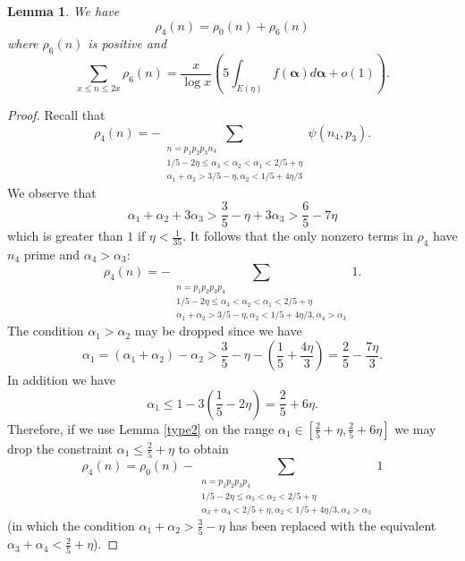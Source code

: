 \documentclass[12pt]{amsart}
\theoremstyle{plain}
\newtheorem{lem}{Lemma}
\theoremstyle{definition}
\newcommand{\bs}{\boldsymbol}
\numberwithin{equation}{section}
\def \a{\alpha} \def \b{\beta} \def \d{\delta} \def \e{\varepsilon} \def \g{\gamma} \def \k{\kappa} \def \l{\lambda} \def \s{\sigma} \def \t{\theta} \def \z{\zeta}
\newcommand{\threesum}[3]{\sum_{\substack{#1\\#2\\#3}}}
\begin{document}
\begin{lem}\label{rho4}
We have 
$$\rho_4(n)=\rho_0(n)+\rho_6(n)$$ 
where $\rho_6(n)$ is positive and 
$$\sum_{x\leq n\leq 2x}\rho_6(n)=\frac{x}{\log x}\left(5\int_{E(\eta)} f(\bs \a)d\bs \a+o(1)\right).$$
\end{lem}

\begin{proof}
Recall that 
$$\rho_4(n)=-\threesum{n=p_1p_2p_3n_4}{1/5-2\eta\leq \a_3<\a_2<\a_1< 2/5+\eta}{\a_1+\a_2>3/5-\eta,\a_2<1/5+4\eta/3}\psi(n_4,p_3).$$
We observe that 
$$\a_1+\a_2+3\a_3>\frac35-\eta+3\a_3>\frac65-7\eta$$
which is greater than $1$ if $\eta<\frac{1}{35}$.  It follows that the only nonzero terms in $\rho_4$ have $n_4$ prime and $\a_4>\a_3$:
$$\rho_4(n)=-\threesum{n=p_1p_2p_3p_4}{1/5-2\eta\leq \a_3<\a_2<\a_1< 2/5+\eta}{\a_1+\a_2>3/5-\eta,\a_2<1/5+4\eta/3,\a_4>\a_3}1.$$
The condition $\a_1>\a_2$ may be dropped since we have 
$$\a_1=(\a_1+\a_2)-\a_2>\frac35-\eta-(\frac15+\frac{4\eta}{3})=\frac25-\frac{7\eta}{3}.$$
In addition we have 
$$\a_1\leq 1-3(\frac15-2\eta)=\frac25+6\eta.$$
Therefore, if we use Lemma \ref{type2} on the range $\a_1\in [\frac25+\eta,\frac25+6\eta]$ we may drop the constraint $\a_1\leq \frac25+\eta$ to obtain 
$$\rho_4(n)=\rho_0(n)-\threesum{n=p_1p_2p_3p_4}{1/5-2\eta\leq \a_3<\a_2< 2/5+\eta}{\a_3+\a_4<2/5+\eta,\a_2<1/5+4\eta/3,\a_4>\a_3}1$$
(in which the condition $\a_1+\a_2>\frac35-\eta$ has been replaced with the equivalent $\a_3+\a_4<\frac25+\eta$).


\end{proof}
\end{document}
